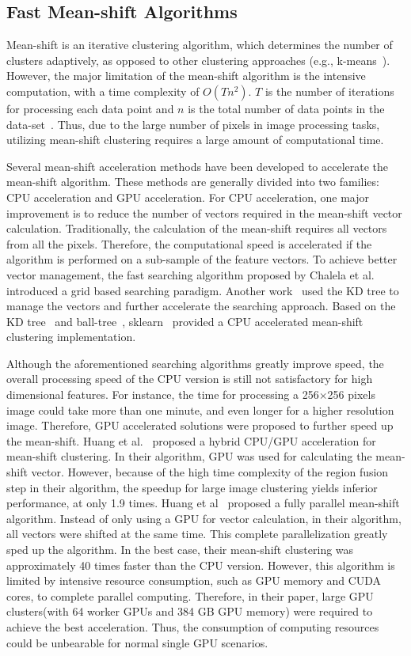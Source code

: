 \documentclass[journal,twoside,web]{ieeecolor}
\begin{document}
\subsection{Fast Mean-shift Algorithms}
Mean-shift is an iterative clustering algorithm, which determines the number of clusters adaptively, as opposed to other clustering approaches (e.g., k-means~\cite{b29}). However, the major limitation of the mean-shift algorithm is the intensive computation, with a time complexity of $O(T{n^2})$. $T$ is the number of iterations for processing each data point and $n$ is the total number of data points in the data-set~\cite{b21}. Thus, due to the large number of pixels in image processing tasks, utilizing mean-shift clustering requires a large amount of computational time.

Several mean-shift acceleration methods have been developed to accelerate the mean-shift algorithm. These methods are generally divided into two families: CPU acceleration and GPU acceleration. For CPU acceleration, one major improvement is to reduce the number of vectors required in the mean-shift vector calculation. Traditionally, the calculation of the mean-shift requires all vectors from all the pixels. Therefore, the computational speed is accelerated if the algorithm is performed on a sub-sample of the feature vectors. To achieve better vector management, the fast searching algorithm proposed by Chalela et al.~\cite{b32} introduced a grid based searching paradigm. Another work~\cite{b16} used the KD tree to manage the vectors and further accelerate the searching approach. Based on the KD tree~\cite{b16} and ball-tree~\cite{b17}, sklearn~\cite{b33} provided a CPU accelerated mean-shift clustering implementation.

Although the aforementioned searching algorithms greatly improve speed, the overall processing speed of the CPU version is still not satisfactory for high dimensional features. For instance, the time for processing a 256$\times$256 pixels image could take more than one minute, and even longer for a higher resolution image. Therefore, GPU accelerated solutions were proposed to further speed up the mean-shift. Huang et al.~\cite{b19} proposed a hybrid CPU/GPU acceleration for mean-shift clustering. In their algorithm, GPU was used for calculating the mean-shift vector. However, because of the high time complexity of the region fusion step in their algorithm, the speedup for large image clustering yields inferior performance, at only 1.9 times. Huang et al~\cite{b18} proposed a fully parallel mean-shift algorithm. Instead of only using a GPU for vector calculation, in their algorithm, all vectors were shifted at the same time. This complete parallelization greatly sped up the algorithm. In the best case, their mean-shift clustering was approximately 40 times faster than the CPU version. However, this algorithm is limited by intensive resource consumption, such as GPU memory and CUDA cores, to complete parallel computing. Therefore, in their paper, large GPU clusters(with 64 worker GPUs and 384 GB GPU memory) were required to achieve the best acceleration. Thus, the consumption of computing resources could be unbearable for normal single GPU scenarios.
\end{document}
